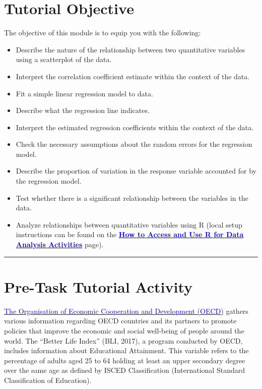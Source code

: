 \documentclass[oneside,openany]{book}
\begin{document}
\section{Tutorial Objective}\label{tutorial-objective-7}

The objective of this module is to equip you with the following:

\begin{itemize}
    \item Describe the nature of the relationship between two quantitative variables using a scatterplot of the data.
    \item Interpret the correlation coefficient estimate within the context of the data.
    \item Fit a simple linear regression model to data.
    \item Describe what the regression line indicates.
    \item Interpret the estimated regression coefficients within the context of the data.
    \item Check the necessary assumptions about the random errors for the regression model.
    \item Describe the proportion of variation in the response variable accounted for by the regression model.
    \item Test whether there is a significant relationship between the variables in the data.
    \item Analyze relationships between quantitative variables using R (local setup instructions can be found on the \hyperref[how-to-set-up-r-for-data-analysis-activities]{\textcolor{blue}{\textbf{How to Access and Use R for Data Analysis Activities}}} page).
\end{itemize}


\begin{center}\rule{0.5\linewidth}{0.5pt}\end{center}

\section{Pre-Task Tutorial Activity}\label{pre-task-tutorial-activity-6}

\href{http://www.oecd.org/about/}{\textcolor{blue}{The Organisation of Economic Cooperation and Development (OECD)}} gathers various information regarding OECD countries and its partners to promote policies that improve the economic and social well-being of people around the world. The ``Better Life Index'' (BLI, 2017), a program conducted by OECD, includes information about Educational Attainment. This variable refers to the percentage of adults aged 25 to 64 holding at least an upper secondary degree over the same age as defined by ISCED Classification (International Standard Classification of Education).
\end{document}
